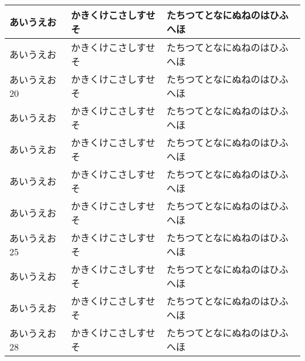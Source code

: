 \documentclass{jsce}
\begin{document}
\begin{minipage}[c]{.95\textwidth}
\begin{center}
\begin{tabular}{|p{6cm}|p{8cm}|p{8cm}|}
あいうえお & かきくけこさしすせそ & たちつてとなにぬねのはひふへほ \\ \hline
あいうえお & かきくけこさしすせそ & たちつてとなにぬねのはひふへほ \\ \hline
あいうえお20 & かきくけこさしすせそ & たちつてとなにぬねのはひふへほ \\ \hline
あいうえお & かきくけこさしすせそ & たちつてとなにぬねのはひふへほ \\ \hline
あいうえお & かきくけこさしすせそ & たちつてとなにぬねのはひふへほ \\ \hline
あいうえお & かきくけこさしすせそ & たちつてとなにぬねのはひふへほ \\ \hline
あいうえお & かきくけこさしすせそ & たちつてとなにぬねのはひふへほ \\ \hline
あいうえお25 & かきくけこさしすせそ & たちつてとなにぬねのはひふへほ \\ \hline
あいうえお & かきくけこさしすせそ & たちつてとなにぬねのはひふへほ \\ \hline
あいうえお & かきくけこさしすせそ & たちつてとなにぬねのはひふへほ \\ \hline
あいうえお28 & かきくけこさしすせそ & たちつてとなにぬねのはひふへほ \\ \hline
\end{tabular}
\end{center}
\end{minipage}
%
\vfill
\mbox{} %
\end{document}
